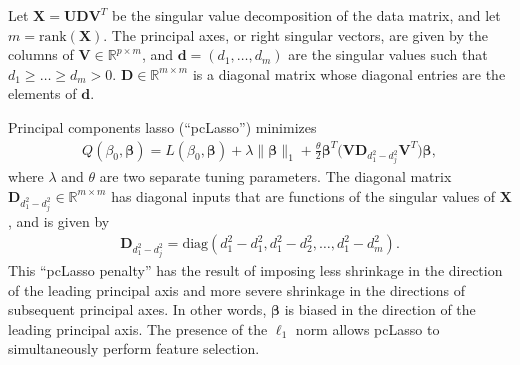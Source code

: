 \documentclass[11pt]{article}
\begin{document}
Let $\mathbf{X} = \mathbf{U} \mathbf{D} \mathbf{V}^T$ be the singular value decomposition of the data matrix, and let $m = \mathrm{rank}(\mathbf{X})$. The principal axes, or right singular vectors, are given by the columns of $\mathbf{V} \in \mathbb{R}^{p \times m}$, and $\bm{d} = (d_1, \ldots, d_m)$ are the singular values such that $d_1 \ge \ldots \ge d_m > 0$. $\mathbf{D} \in \mathbb{R}^{m \times m}$ is a diagonal matrix whose diagonal entries are the elements of $\bm{d}$. 

Principal components lasso (``pcLasso'') \cite{2018arXiv181004651T} minimizes 
\begin{align}
    \label{pcLasso}
    Q(\beta_0, \bm{\beta}) = L(\beta_0, \bm{\beta}) + \lambda \| \bm{\beta} \|_1 + \frac{\theta}{2} \bm{\beta}^T \Big( \mathbf{V} \mathbf{D}_{d_1^2 - d_j^2} \mathbf{V}^T \Big) \bm{\beta},
\end{align}
where $\lambda$ and $\theta$ are two separate tuning parameters. The diagonal matrix $\mathbf{D}_{d_1^2 - d_j^2} \in \mathbb{R}^{m \times m}$ has diagonal inputs that are functions of the singular values of $\mathbf{X}$, and is given by 
\begin{align}
    \label{pcLassopenaltymatrix}
    \mathbf{D}_{d_1^2 - d_j^2} = \mathrm{diag}(d_1^2 - d_1^2, d_1^2 - d_2^2, \ldots, d_1^2 - d_m^2).
\end{align}
This ``pcLasso penalty'' has the result of imposing less shrinkage in the direction of the leading principal axis and more severe shrinkage in the directions of subsequent principal axes. In other words, $\bm{\beta}$ is biased in the direction of the leading principal axis. %
The presence of the $\ell_1$ norm allows pcLasso to simultaneously perform feature selection. 
\end{document}
